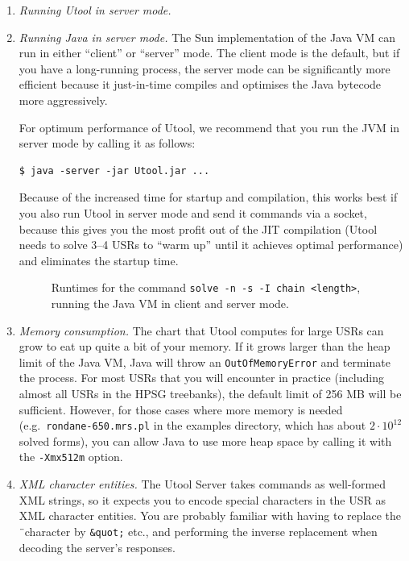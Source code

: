 \begin{enumerate}
\item \textit{Running Utool in server mode.} 


\item \textit{Running Java in server mode.} The Sun implementation of the
Java VM can run in either ``client'' or ``server'' mode. The client
mode is the default, but if you have a long-running process, the
server mode can be significantly more efficient because it
just-in-time compiles and optimises the Java bytecode more
aggressively.

For optimum performance of Utool, we recommend that you run the JVM in
server mode by calling it as follows:
\begin{verbatim}
$ java -server -jar Utool.jar ...
\end{verbatim}

Because of the increased time for startup and compilation, this works
best if you also run Utool in server mode and send it commands via a
socket, because this gives you the most profit out of the JIT
compilation (Utool needs to solve 3--4 USRs to ``warm up'' until it
achieves optimal performance) and eliminates the startup time.

\begin{figure}
\begin{center}
\end{center}
\caption{Runtimes for the command \texttt{solve -n -s -I chain
<length>}, running the Java VM in client and server
mode. \label{fig:chains-server-client}}
\end{figure}


\item \textit{Memory consumption.} The chart that Utool computes for
large USRs can grow to eat up quite a bit of your memory. If it grows
larger than the heap limit of the Java VM, Java will throw an
\verb?OutOfMemoryError? and terminate the process. For most USRs that
you will encounter in practice (including almost all USRs in the HPSG
treebanks), the default limit of 256 MB will be sufficient. However,
for those cases where more memory is needed (e.g.\
\verb?rondane-650.mrs.pl? in the examples directory, which has about
$2 \cdot 10^{12}$ solved forms), you can allow Java to use more heap
space by calling it with the \verb?-Xmx512m? option.

\item \textit{XML character entities.} The Utool Server takes commands
as well-formed XML strings, so it expects you to encode special
characters in the USR as XML character entities. You are probably
familiar with having to replace the \"\ character by \verb?&quot;?
etc., and performing the inverse replacement when decoding the
server's responses.


\end{enumerate}
